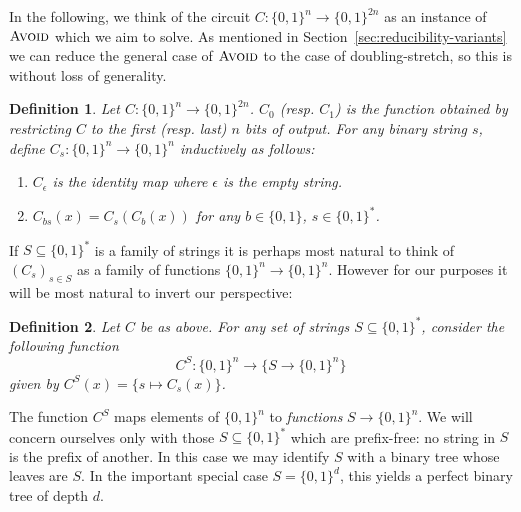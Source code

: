 \documentclass[11pt]{article}
\newtheorem{definition}{Definition}
\newcommand{\B}{\{0,1\}}
\newcommand{\avoid}{\textsc{Avoid}}
\begin{document}
In the following, we think of the circuit $C: \B^n \to \B^{2n}$ as an instance of $\avoid$ which we aim to solve. As mentioned in Section~\ref{sec:reducibility-variants} we can reduce the general case of $\avoid$ to the case of doubling-stretch, so this is without loss of generality.
\begin{definition}
Let $C: \B^n \to \B^{2n}$. $C_0$ (resp. $C_1$) is the function obtained by restricting $C$ to the first (resp. last) $n$ bits of output. For any binary string $s$, define $C_s: \B^n \to \B^n$ inductively as follows:
\begin{enumerate}
	\item $C_{\epsilon}$ is the identity map where $\epsilon$ is the empty string.
	\item $C_{bs}(x) = C_s(C_b(x))$ for any $b \in \B$, $s \in \B^*$.
\end{enumerate}
\end{definition}
If $S \subseteq \B^*$ is a family of strings it is perhaps most natural to think of $(C_s)_{s \in S}$ as a family of functions $\B^n \to \B^n$. However for our purposes it will be most natural to invert our perspective:
\begin{definition}
Let $C$ be as above.
For any set of strings $S \subseteq \B^*$, consider the following function
\[
C^S: \B^n \to \{S \to \B^n\}
\]
given by $C^S(x) = \{s \mapsto C_s(x)\}$.
\end{definition}

The function $C^S$ maps elements of $\B^n$ to \emph{functions} $S \to \B^n$. We will concern ourselves only with those $S \subseteq \B^*$ which are prefix-free: no string in $S$ is the prefix of another. In this case we may identify $S$ with a binary tree whose leaves are $S$. In the important special case $S = \B^d$, this yields a perfect binary tree of depth $d$.
\end{document}
